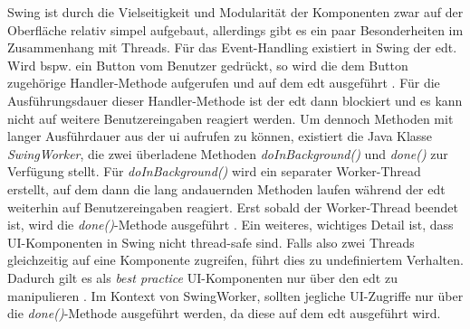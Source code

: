 Swing ist durch die Vielseitigkeit und Modularität der Komponenten zwar auf der Oberfläche relativ simpel aufgebaut, allerdings gibt es ein paar Besonderheiten im Zusammenhang mit Threads. Für das Event-Handling existiert in Swing der \acrfull{edt}. Wird bspw. ein Button vom Benutzer gedrückt, so wird die dem Button zugehörige Handler-Methode aufgerufen und auf dem \acrshort{edt} ausgeführt \autocite[]{edtDocs}. Für die Ausführungsdauer dieser Handler-Methode ist der \acrshort{edt} dann blockiert und es kann nicht auf weitere Benutzereingaben reagiert werden. 
Um dennoch Methoden mit langer Ausführdauer aus der \acrshort{ui} aufrufen zu können, existiert die Java Klasse \textit{SwingWorker}, die zwei überladene Methoden \textit{doInBackground()} und \textit{done()} zur Verfügung stellt. Für \textit{doInBackground()} wird ein separater Worker-Thread erstellt, auf dem dann die lang andauernden Methoden laufen während der \acrshort{edt} weiterhin auf Benutzereingaben reagiert. Erst sobald der Worker-Thread beendet ist, wird die \textit{done()}-Methode ausgeführt \autocite[]{swingWorkerDocs}.
Ein weiteres, wichtiges Detail ist, dass UI-Komponenten in Swing nicht thread-safe sind. Falls also zwei Threads gleichzeitig auf eine Komponente zugreifen, führt dies zu undefiniertem Verhalten. Dadurch gilt es als \textit{best practice} UI-Komponenten nur über den \acrshort{edt} zu manipulieren \autocite[]{edtDocs}. Im Kontext von SwingWorker, sollten jegliche UI-Zugriffe nur über die \textit{done()}-Methode ausgeführt werden, da diese auf dem \acrshort{edt} ausgeführt wird.